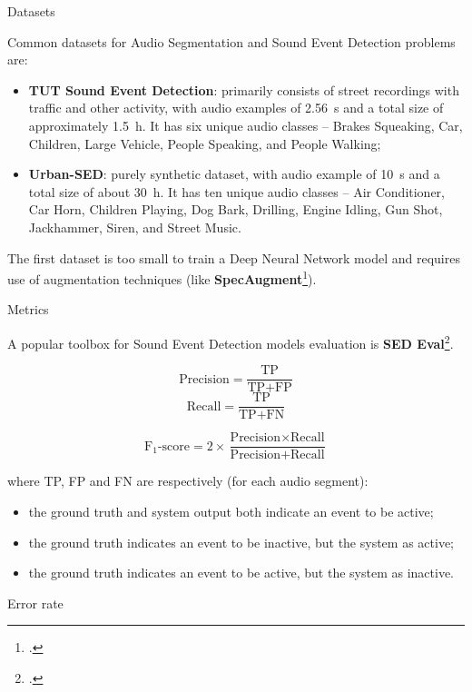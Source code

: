 	\begin{frame}{Datasets}
	
		Common datasets for Audio Segmentation and Sound Event Detection problems are:
		
		\begin{itemize}
			\item \textbf{TUT Sound Event Detection}: primarily consists of street recordings with traffic and other activity, with audio examples of \SI{2.56}{\second} and a total size of approximately \SI{1.5}{\hour}. It has six unique audio classes -- Brakes Squeaking, Car, Children, Large Vehicle, People Speaking, and People Walking;
			\item \textbf{Urban-SED}: purely synthetic dataset, with audio example of \SI{10}{\second} and a total size of about \SI{30}{\hour}. It has ten unique audio classes -- Air Conditioner, Car Horn, Children Playing, Dog Bark, Drilling, Engine Idling, Gun Shot, Jackhammer, Siren, and Street Music.
		\end{itemize}
		
		The first dataset is too small to train a Deep Neural Network model and requires use of augmentation techniques (like \textbf{SpecAugment}\footcite{park19e_interspeech}).

	\end{frame}
	
	\begin{frame}[allowframebreaks]{Metrics}
	
		A popular toolbox for Sound Event Detection models evaluation is \textbf{SED Eval}\footcite{app6060162}.\vspace{-3em}
		\begin{multicols}{2}
  			\begin{equation*}
    			\text{Precision} = \frac{\text{TP}}{\text{TP} + \text{FP}}
  			\end{equation*}\break
  			\begin{equation*}
    			\text{Recall} = \frac{\text{TP}}{\text{TP} + \text{FN}}
  			\end{equation*}
		\end{multicols}
		\vspace{-1em}
		\begin{equation*}
			\text{F$_{1}$-score} = 2 \times \frac{\text{Precision} \times \text{Recall}}{\text{Precision} + \text{Recall}}
		\end{equation*}
		
		where TP, FP and FN are respectively (for each audio segment):
		\begin{itemize}
			\item the ground truth and system output both indicate an event to be active;
			\item the ground truth indicates an event to be inactive, but the system as active;
			\item the ground truth indicates an event to be active, but the system as inactive.
		\end{itemize}
		
		\framebreak
		
		Error rate
		
	\end{frame}
	
